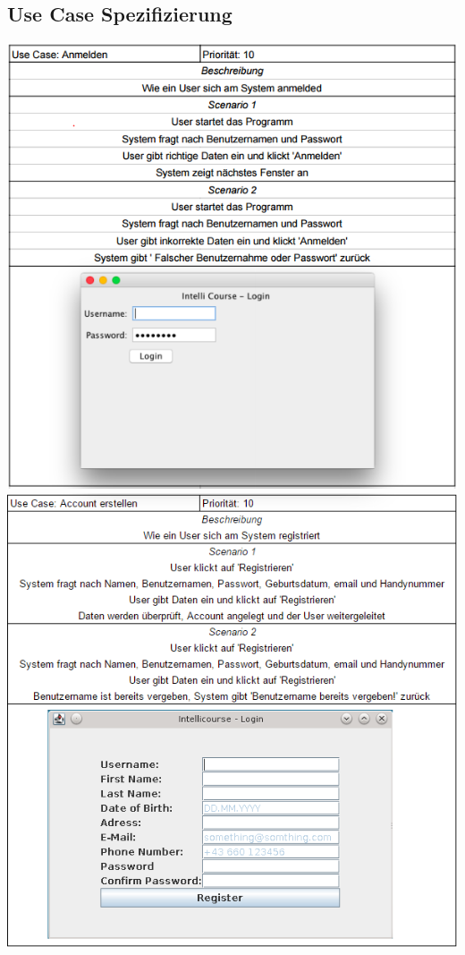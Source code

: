 \documentclass[a4paper,12pt]{article}
\begin{document}
	\subsection*{Use Case Spezifizierung}
	\begin{center}
		\includegraphics[scale=.8]{UCLogin.png}
		\newpage
		\includegraphics[scale=.8]{UCRegister.png}

\end{center}
\end{document}
